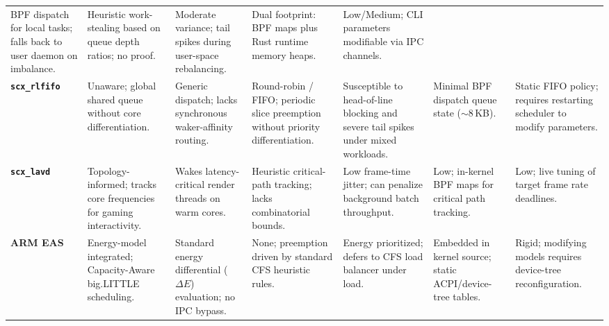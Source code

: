 \documentclass[conference]{IEEEtran}
\begin{document}
\begin{table}[t]
\begin{tabularx}{\textwidth}{l X X X X X X}
BPF dispatch for local tasks; falls back to user daemon on imbalance. & 
Heuristic work-stealing based on queue depth ratios; no proof. & 
Moderate variance; tail spikes during user-space rebalancing. & 
Dual footprint: BPF maps plus Rust runtime memory heaps. & 
Low/Medium; CLI parameters modifiable via IPC channels. \\
\textbf{\texttt{scx\_rlfifo}} \newline \cite{scx_repo} & 
Unaware; global shared queue without core differentiation. & 
Generic dispatch; lacks synchronous waker-affinity routing. & 
Round-robin / FIFO; periodic slice preemption without priority differentiation. & 
Susceptible to head-of-line blocking and severe tail spikes under mixed workloads. & 
Minimal BPF dispatch queue state ($\sim$8\,KB). & 
Static FIFO policy; requires restarting scheduler to modify parameters. \\
\textbf{\texttt{scx\_lavd}} \newline \cite{min2024scxlavd} & 
Topology-informed; tracks core frequencies for gaming interactivity. & 
Wakes latency-critical render threads on warm cores. & 
Heuristic critical-path tracking; lacks combinatorial bounds. & 
Low frame-time jitter; can penalize background batch throughput. & 
Low; in-kernel BPF maps for critical path tracking. & 
Low; live tuning of target frame rate deadlines. \\
\textbf{ARM EAS} \newline \cite{rasmussen2018eas} & 
Energy-model integrated; Capacity-Aware big.LITTLE scheduling. & 
Standard energy differential ($\Delta E$) evaluation; no IPC bypass. & 
None; preemption driven by standard CFS heuristic rules. & 
Energy prioritized; defers to CFS load balancer under load. & 
Embedded in kernel source; static ACPI/device-tree tables. & 
Rigid; modifying models requires device-tree reconfiguration. \\
\bottomrule
\end{tabularx}
\end{table}
\end{document}
